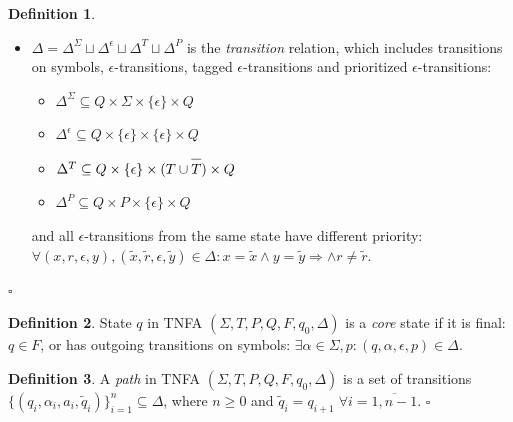 \documentclass{article}
\newcommand{\Xin}{\!\in\!}
\newcommand{\Xeq}{\!=\!}
\newcommand*{\Xbar}[1]{\overline{#1\vphantom{\bar{#1}}}}
\theoremstyle{definition}
\newtheorem{Xdef}{Definition}
\begin{document}
\begin{multicols}{2}
\begin{Xdef}
\begin{itemize}

        \item[] $\Delta \Xeq \Delta^\Sigma \sqcup \Delta^\epsilon \sqcup \Delta^T \sqcup \Delta^P$ is the \emph{transition} relation, which includes
        transitions on symbols, $\epsilon$-transitions, tagged $\epsilon$-transitions and prioritized $\epsilon$-transitions:
        \begin{itemize}
            \item[] $\Delta^\Sigma \subseteq Q \times \Sigma \times \{\epsilon\} \times Q$
            \item[] $\Delta^\epsilon \subseteq Q \times \{\epsilon\} \times \{\epsilon\} \times Q$
            \item[] $\Delta^T \subseteq Q \times \{\epsilon\} \times (T \cup \Xbar{T}) \times Q$
            \item[] $\Delta^P \subseteq Q \times P \times \{\epsilon\} \times Q$
        \end{itemize}

        and all $\epsilon$-transitions from the same state have different priority:
        $\forall (x, r, \epsilon, y), (\widetilde{x}, \widetilde{r}, \epsilon, \widetilde{y}) \Xin \Delta:
        x \Xeq \widetilde{x} \wedge y \Xeq \widetilde{y} \Rightarrow \wedge r \!\neq\! \widetilde{r}$.
    \end{itemize}
    $\square$
    \end{Xdef}

    \begin{Xdef}
    State $q$ in TNFA $(\Sigma, T, P, Q, F, q_0, \Delta)$
    is a \emph{core} state if it is final: $q \Xin F$,
    or has outgoing transitions on symbols: $\exists \alpha \Xin \Sigma, p: (q, \alpha, \epsilon, p) \Xin \Delta$.
    \end{Xdef}

    \begin{Xdef}
    A \emph{path} in TNFA $(\Sigma, T, P, Q, F, q_0, \Delta)$ is a set of transitions
    $\{(q_i, \alpha_i, a_i, \widetilde{q}_i)\}_{i=1}^n \subseteq \Delta$, where $n \!\geq\! 0$
    and $\widetilde{q}_i \Xeq q_{i+1} \; \forall i \Xeq \overline{1,n-1}$.
    $\square$
    \end{Xdef}


\end{multicols}
\end{document}
